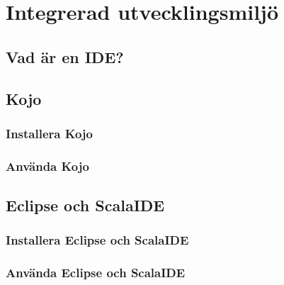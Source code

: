
\chapter{Integrerad utvecklingsmiljö}\label{appendix:ide}

\section{Vad är en IDE?}

\section{Kojo}\label{appendix:kojo}

\subsection{Installera Kojo}

\subsection{Använda Kojo}


\section{Eclipse och ScalaIDE}\label{appendix:eclipse}

\subsection{Installera Eclipse och ScalaIDE}

\subsection{Använda Eclipse och ScalaIDE}

